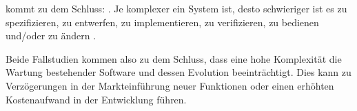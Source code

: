 
 kommt zu dem Schluss: . Je komplexer ein System ist, desto schwieriger ist es zu spezifizieren, zu entwerfen, zu implementieren, zu verifizieren, zu bedienen und/oder zu ändern \citep[vgl.][13]{Ogheneovo2014}.


Beide Fallstudien kommen also zu dem Schluss, dass eine hohe Komplexität die Wartung bestehender Software und dessen Evolution beeinträchtigt. Dies kann zu Verzögerungen in der Markteinführung neuer Funktionen oder einen erhöhten Kostenaufwand in der Entwicklung führen.


